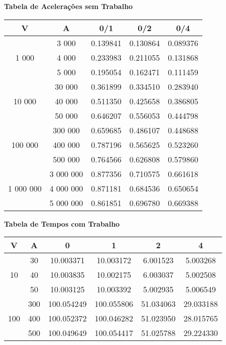 \documentclass[12pt]{article}
\newcommand{\tb}{\textbf}
\begin{document}
\newpage
\begin{center}
	\tb{Tabela de Acelerações sem Trabalho}
\begin{tabular}{|c|c||c|c|c|}
	\hline
	V & A & 0/1 & 0/2 & 0/4 \\
	\hline
	      & 3 000 & 0.139841 & 0.130864 & 0.089376 \\
	1 000 & 4 000 & 0.233983 & 0.211055 & 0.131868 \\
	      & 5 000 & 0.195054 & 0.162471 & 0.111459 \\
	\hline
	       & 30 000 & 0.361899 & 0.334510 & 0.283940 \\
	10 000 & 40 000 & 0.511350 & 0.425658 & 0.386805 \\
	       & 50 000 & 0.646207 & 0.556053 & 0.444798 \\
	\hline
	        & 300 000 & 0.659685 & 0.486107 & 0.448688 \\
	100 000 & 400 000 & 0.787196 & 0.565625 & 0.523260 \\
	        & 500 000 & 0.764566 & 0.626808 & 0.579860 \\
	\hline
	          & 3 000 000 & 0.877356 & 0.710575 & 0.661618 \\
	1 000 000 & 4 000 000 & 0.871181 & 0.684536 & 0.650654 \\
	          & 5 000 000 & 0.861851 & 0.696780 & 0.669388 \\
	\hline
\end{tabular}\end{center}

\begin{center}
	\tb{Tabela de Tempos com Trabalho}
\begin{tabular}{|c|c||c|c|c|c|}
	\hline
	V & A & 0 & 1 & 2 & 4 \\
	\hline
	   & 30 & 10.003371 & 10.003172 & 6.001523 & 5.003268 \\
	10 & 40 & 10.003835 & 10.002175 & 6.003037 & 5.002508 \\
	   & 50 & 10.003125 & 10.003392 & 5.002935 & 5.006549 \\
	\hline
	    & 300 & 100.054249 & 100.055806 & 51.034063 & 29.033188 \\
	100 & 400 & 100.052372 & 100.046282 & 51.023950 & 28.015765 \\
	    & 500 & 100.049649 & 100.054417 & 51.025788 & 29.224330 \\
	\hline
\end{tabular}\end{center}
\end{document}
